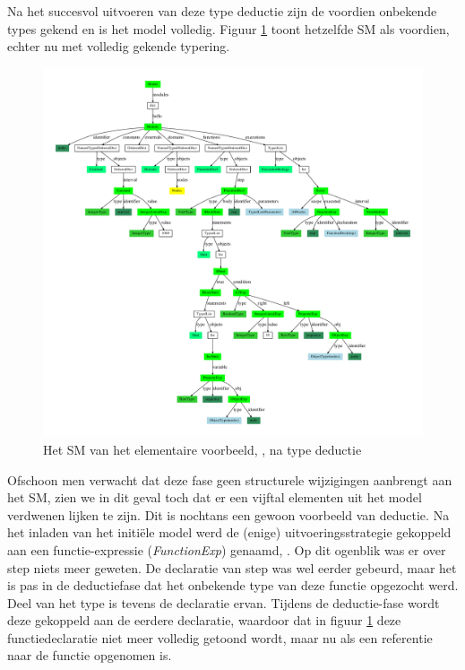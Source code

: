 Na het succesvol uitvoeren van deze type deductie zijn de voordien onbekende
types gekend en is het model volledig. Figuur \ref{fig:hello.sm-inferred} toont
hetzelfde SM als voordien, echter nu met volledig gekende typering.

\begin{figure}[ht]
  \centering
  \includegraphics[width=\linewidth]{resources/hello_sm_inferred.pdf}
  \caption{Het SM van het elementaire voorbeeld, , na type deductie}
  \label{fig:hello.sm-inferred}
\end{figure}

Ofschoon men verwacht dat deze fase geen structurele wijzigingen aanbrengt aan
het SM, zien we in dit geval toch dat er een vijftal elementen uit het model
verdwenen lijken te zijn. Dit is nochtans een gewoon voorbeeld van deductie. Na
het inladen van het initi\"ele model werd de (enige) uitvoeringsstrategie
gekoppeld aan een functie-expressie (\emph{FunctionExp}) genaamd, .
Op dit ogenblik was er over step niets meer geweten. De declaratie van step was
wel eerder gebeurd, maar het is pas in de deductiefase dat het onbekende type
van deze functie opgezocht werd. Deel van het type is tevens de declaratie
ervan. Tijdens de deductie-fase wordt deze gekoppeld aan de eerdere declaratie,
waardoor dat in figuur \ref{fig:hello.sm-inferred} deze functiedeclaratie niet
meer volledig getoond wordt, maar nu als een referentie naar de 
functie opgenomen is.

